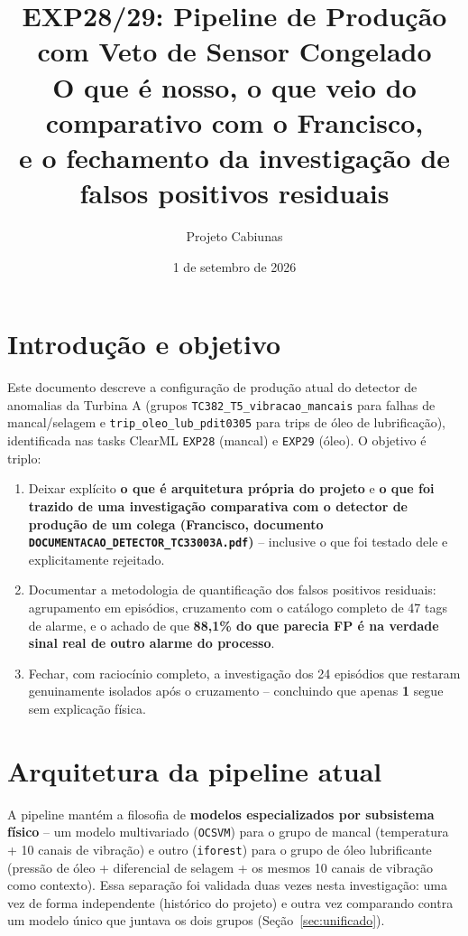 \documentclass[11pt,a4paper]{article}
\title{\textbf{EXP28/29: Pipeline de Produção com Veto de Sensor Congelado}\\[4pt]
  \large O que é nosso, o que veio do comparativo com o Francisco,\\
  \large e o fechamento da investigação de falsos positivos residuais}
\author{Projeto Cabiunas}
\date{1 de setembro de 2026}
\begin{document}
\maketitle
\thispagestyle{empty}
\tableofcontents
\newpage

\section{Introdução e objetivo}
\label{sec:intro}

Este documento descreve a configuração de produção atual do detector
de anomalias da Turbina A (grupos \texttt{TC382\_T5\_vibracao\_mancais}
para falhas de mancal/selagem e \texttt{trip\_oleo\_lub\_pdit0305} para
trips de óleo de lubrificação), identificada nas tasks ClearML
\texttt{EXP28} (mancal) e \texttt{EXP29} (óleo). O objetivo é triplo:

\begin{enumerate}
  \item Deixar explícito \textbf{o que é arquitetura própria do
    projeto} e \textbf{o que foi trazido de uma investigação
    comparativa com o detector de produção de um colega (Francisco,
    documento \texttt{DOCUMENTACAO\_DETECTOR\_TC33003A.pdf})} --
    inclusive o que foi testado dele e explicitamente rejeitado.
  \item Documentar a metodologia de quantificação dos falsos positivos
    residuais: agrupamento em episódios, cruzamento com o catálogo
    completo de 47 tags de alarme, e o achado de que \textbf{88,1\% do
    que parecia FP é na verdade sinal real de outro alarme do
    processo}.
  \item Fechar, com raciocínio completo, a investigação dos 24
    episódios que restaram genuinamente isolados após o cruzamento --
    concluindo que apenas \textbf{1} segue sem explicação física.
\end{enumerate}

\section{Arquitetura da pipeline atual}
\label{sec:arquitetura}

A pipeline mantém a filosofia de \textbf{modelos especializados por
subsistema físico} -- um modelo multivariado (\texttt{OCSVM}) para o
grupo de mancal (temperatura + 10 canais de vibração) e outro
(\texttt{iforest}) para o grupo de óleo lubrificante (pressão de óleo +
diferencial de selagem + os mesmos 10 canais de vibração como
contexto). Essa separação foi validada duas vezes nesta investigação:
uma vez de forma independente (histórico do projeto) e outra vez
comparando contra um modelo único que juntava os dois grupos
(Seção~\ref{sec:unificado}).
\end{document}
